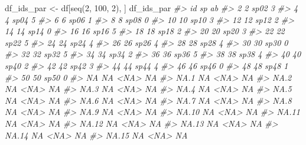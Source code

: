 \documentclass[
]{book}
\newenvironment{Shaded}{\begin{snugshade}}{\end{snugshade}}
\newcommand{\CommentTok}[1]{\textcolor[rgb]{0.56,0.35,0.01}{\textit{#1}}}
\newcommand{\DecValTok}[1]{\textcolor[rgb]{0.00,0.00,0.81}{#1}}
\newcommand{\FunctionTok}[1]{\textcolor[rgb]{0.00,0.00,0.00}{#1}}
\newcommand{\NormalTok}[1]{#1}
\newcommand{\OtherTok}[1]{\textcolor[rgb]{0.56,0.35,0.01}{#1}}
\begin{document}
\begin{Shaded}
\begin{Highlighting}[]
\NormalTok{df\_ids\_par }\OtherTok{\textless{}{-}}\NormalTok{ df[}\FunctionTok{seq}\NormalTok{(}\DecValTok{2}\NormalTok{, }\DecValTok{100}\NormalTok{, }\DecValTok{2}\NormalTok{), ]}
\NormalTok{df\_ids\_par}
\CommentTok{\#\textgreater{}       id   sp ab}
\CommentTok{\#\textgreater{} 2      2 sp02  3}
\CommentTok{\#\textgreater{} 4      4 sp04  5}
\CommentTok{\#\textgreater{} 6      6 sp06  1}
\CommentTok{\#\textgreater{} 8      8 sp08  0}
\CommentTok{\#\textgreater{} 10    10 sp10  3}
\CommentTok{\#\textgreater{} 12    12 sp12  2}
\CommentTok{\#\textgreater{} 14    14 sp14  0}
\CommentTok{\#\textgreater{} 16    16 sp16  5}
\CommentTok{\#\textgreater{} 18    18 sp18  2}
\CommentTok{\#\textgreater{} 20    20 sp20  3}
\CommentTok{\#\textgreater{} 22    22 sp22  5}
\CommentTok{\#\textgreater{} 24    24 sp24  4}
\CommentTok{\#\textgreater{} 26    26 sp26  4}
\CommentTok{\#\textgreater{} 28    28 sp28  4}
\CommentTok{\#\textgreater{} 30    30 sp30  0}
\CommentTok{\#\textgreater{} 32    32 sp32  5}
\CommentTok{\#\textgreater{} 34    34 sp34  2}
\CommentTok{\#\textgreater{} 36    36 sp36  5}
\CommentTok{\#\textgreater{} 38    38 sp38  4}
\CommentTok{\#\textgreater{} 40    40 sp40  2}
\CommentTok{\#\textgreater{} 42    42 sp42  3}
\CommentTok{\#\textgreater{} 44    44 sp44  4}
\CommentTok{\#\textgreater{} 46    46 sp46  0}
\CommentTok{\#\textgreater{} 48    48 sp48  1}
\CommentTok{\#\textgreater{} 50    50 sp50  0}
\CommentTok{\#\textgreater{} NA    NA \textless{}NA\textgreater{} NA}
\CommentTok{\#\textgreater{} NA.1  NA \textless{}NA\textgreater{} NA}
\CommentTok{\#\textgreater{} NA.2  NA \textless{}NA\textgreater{} NA}
\CommentTok{\#\textgreater{} NA.3  NA \textless{}NA\textgreater{} NA}
\CommentTok{\#\textgreater{} NA.4  NA \textless{}NA\textgreater{} NA}
\CommentTok{\#\textgreater{} NA.5  NA \textless{}NA\textgreater{} NA}
\CommentTok{\#\textgreater{} NA.6  NA \textless{}NA\textgreater{} NA}
\CommentTok{\#\textgreater{} NA.7  NA \textless{}NA\textgreater{} NA}
\CommentTok{\#\textgreater{} NA.8  NA \textless{}NA\textgreater{} NA}
\CommentTok{\#\textgreater{} NA.9  NA \textless{}NA\textgreater{} NA}
\CommentTok{\#\textgreater{} NA.10 NA \textless{}NA\textgreater{} NA}
\CommentTok{\#\textgreater{} NA.11 NA \textless{}NA\textgreater{} NA}
\CommentTok{\#\textgreater{} NA.12 NA \textless{}NA\textgreater{} NA}
\CommentTok{\#\textgreater{} NA.13 NA \textless{}NA\textgreater{} NA}
\CommentTok{\#\textgreater{} NA.14 NA \textless{}NA\textgreater{} NA}
\CommentTok{\#\textgreater{} NA.15 NA \textless{}NA\textgreater{} NA}

\end{Highlighting}
\end{Shaded}
\end{document}
